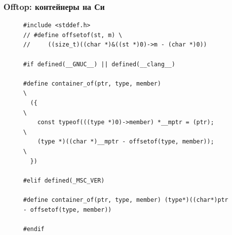 \documentclass[aspectratio=169, pdf, 8pt, unicode]{beamer}
\begin{document}
\begin{frame}[fragile]
\frametitle{Offtop: контейнеры на Си}
\begin{figure}[H]
\centering
\begin{minipage}{0.8\textwidth}
\begin{verbatim}
#include <stddef.h>
// #define offsetof(st, m) \
//     ((size_t)((char *)&((st *)0)->m - (char *)0))

#if defined(__GNUC__) || defined(__clang__)

#define container_of(ptr, type, member)                                        \
  ({                                                                           \
    const typeof(((type *)0)->member) *__mptr = (ptr);                         \
    (type *)((char *)__mptr - offsetof(type, member));                         \
  })

#elif defined(_MSC_VER)

#define container_of(ptr, type, member) (type*)((char*)ptr - offsetof(type, member))

#endif    
\end{verbatim}
\end{minipage}
\end{figure}
\end{frame}
\end{document}
